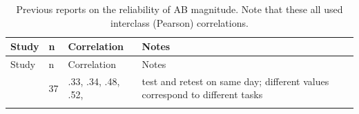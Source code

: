 \documentclass[11pt,]{memoir}
\begin{document}
\begin{longtable}[]{@{}llll@{}}
\caption{\label{tab:AB-reliability} Previous reports on the reliability of AB magnitude. Note that these all used interclass (Pearson) correlations.}\tabularnewline
\toprule
\begin{minipage}[b]{0.19\columnwidth}\raggedright
Study\strut
\end{minipage} & \begin{minipage}[b]{0.03\columnwidth}\raggedright
n\strut
\end{minipage} & \begin{minipage}[b]{0.15\columnwidth}\raggedright
Correlation\strut
\end{minipage} & \begin{minipage}[b]{0.51\columnwidth}\raggedright
Notes\strut
\end{minipage}\tabularnewline
\midrule
\endfirsthead
\toprule
\begin{minipage}[b]{0.19\columnwidth}\raggedright
Study\strut
\end{minipage} & \begin{minipage}[b]{0.03\columnwidth}\raggedright
n\strut
\end{minipage} & \begin{minipage}[b]{0.15\columnwidth}\raggedright
Correlation\strut
\end{minipage} & \begin{minipage}[b]{0.51\columnwidth}\raggedright
Notes\strut
\end{minipage}\tabularnewline
\midrule
\endhead
\begin{minipage}[t]{0.19\columnwidth}\raggedright
\textcite{Kelly2011}\strut
\end{minipage} & \begin{minipage}[t]{0.03\columnwidth}\raggedright
37\strut
\end{minipage} & \begin{minipage}[t]{0.15\columnwidth}\raggedright
.33, .34, .48, .52,\strut
\end{minipage} & \begin{minipage}[t]{0.51\columnwidth}\raggedright
test and retest on same day; different values correspond to different tasks\strut
\end{minipage}\tabularnewline
\begin{minipage}[t]{0.19\columnwidth}\raggedright
\textcite{Dale2013a}\strut
\end{minipage} & \begin{minipage}[t]{0.03\columnwidth}\raggedright

\end{minipage}
\end{longtable}
\end{document}
